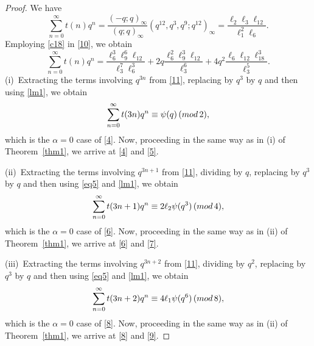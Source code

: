 \documentclass[10pt,a4paper]{amsart}
\renewcommand{\pmod}[1]{\,(\textup{mod}\,#1)}
\begin{document}
\begin{proof}
We have
\begin{equation}\label{10}
\sum_{n=0}^{\infty}t(n)q^n=\dfrac{(-q;q)_\infty}{(q;q)_\infty}(q^{12},q^3,q^9;q^{12})_\infty=\dfrac{\ell_2\ell_3\ell_{12}}{\ell_1^2\ell_6}.
\end{equation}Employing \eqref{c18} in \eqref{10}, we obtain
\begin{equation}\label{11}
\sum_{n=0}^{\infty}t(n)q^n=\dfrac{\ell_6^3\ell_9^6\ell_{12}}{\ell_3^7\ell_6^3}+2q\dfrac{\ell_6^2\ell_9^3\ell_{12}}{\ell_3^6}+4q^2\dfrac{\ell_6\ell_{12}\ell_{18}^3}{\ell_3^5}.
\end{equation}
(i)~Extracting the terms involving $q^{3n}$ from \eqref{11}, replacing by $q^3$ by $q$ and then using \eqref{lm1}, we obtain
$$ \sum_{n=0}^{\infty}t(3n)q^n\equiv\psi(q)\pmod{2},$$ which is the $\alpha=0$ case of \eqref{4}. Now, proceeding in the same way as in (i) of Theorem~\ref{thm1}, we arrive at \eqref{4} and \eqref{5}.

(ii)~Extracting the terms involving $q^{3n+1}$ from \eqref{11}, dividing by $q$, replacing by $q^3$ by $q$ and then using \eqref{eq5} and \eqref{lm1}, we obtain
$$\sum_{n=0}^{\infty}t(3n+1)q^n\equiv2\ell_2\psi(q^3)\pmod{4},$$ which is the $\alpha=0$ case of \eqref{6}. Now, proceeding in the same way as in (ii) of Theorem~\ref{thm1}, we arrive at \eqref{6} and \eqref{7}.

(iii)~Extracting the terms involving $q^{3n+2}$ from \eqref{11}, dividing by $q^2$, replacing by $q^3$ by $q$ and then using \eqref{eq5} and \eqref{lm1}, we obtain
$$\sum_{n=0}^{\infty}t(3n+2)q^n\equiv4\ell_1\psi(q^6)\pmod{8},$$ which is the $\alpha=0$ case of \eqref{8}. Now, proceeding in the same way as in (ii) of Theorem~\ref{thm1}, we arrive at \eqref{8} and \eqref{9}.
\end{proof}
\end{document}

